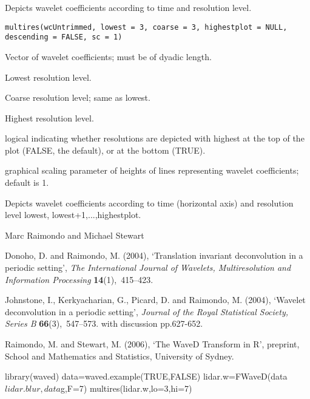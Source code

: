 \begin{Description}\relax
Depicts wavelet coefficients according to time and resolution level.
\end{Description}
\begin{Usage}
\begin{verbatim}
multires(wcUntrimmed, lowest = 3, coarse = 3, highestplot = NULL, descending = FALSE, sc = 1)
\end{verbatim}
\end{Usage}
\begin{Arguments}
\begin{ldescription}
\item[\code{wcUntrimmed}] Vector of wavelet coefficients; must be of dyadic length.
\item[\code{lowest}] Lowest resolution level.
\item[\code{coarse}] Coarse resolution level; same as lowest.
\item[\code{highestplot}] Highest resolution level.
\item[\code{descending}] logical indicating whether resolutions are depicted with highest at the top of the plot (FALSE, the default), or at the bottom (TRUE).
\item[\code{sc}] graphical scaling parameter of heights of lines representing wavelet coefficients; default is 1.
\end{ldescription}
\end{Arguments}
\begin{Value}
Depicts wavelet coefficients according to time (horizontal axis)
and resolution level lowest, lowest+1,...,highestplot.
\end{Value}
\begin{Author}\relax
Marc Raimondo and Michael Stewart
\end{Author}
\begin{References}\relax
Donoho, D. and Raimondo, M.  (2004),
`Translation invariant deconvolution in a periodic setting', {\em The
International Journal of Wavelets, Multiresolution and Information
Processing} {\bf 14}(1),~415--423.

Johnstone, I., Kerkyacharian, G., Picard, D. and Raimondo, M.  (2004), 
`Wavelet deconvolution in a periodic
setting', {\em Journal of the Royal Statistical Society, Series B} {\bf
66}(3),~547--573.  with discussion pp.627-652.

Raimondo, M. and Stewart, M. (2006),
`The WaveD Transform in R', preprint, School and Mathematics and Statistics,
University of Sydney.
\end{References}
\begin{SeeAlso}\relax
{}
\end{SeeAlso}
\begin{Examples}
\begin{ExampleCode}
library(waved)
data=waved.example(TRUE,FALSE)
lidar.w=FWaveD(data$lidar.blur,data$g,F=7)
multires(lidar.w,lo=3,hi=7)
\end{ExampleCode}
\end{Examples}

